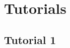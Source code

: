 \documentclass[english, 11pt]{article}
\begin{document}

   \section{Tutorials}

     \subsection{Tutorial 1}
\end{document}
